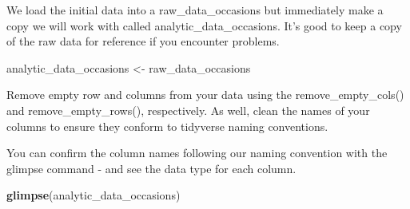 \documentclass[
]{krantz}
\makeatletter
\newenvironment{Shaded}{\begin{snugshade}}{\end{snugshade}}
\newcommand{\CommentTok}[1]{\textcolor[rgb]{0.37,0.37,0.37}{\textit{#1}}}
\newcommand{\KeywordTok}[1]{\textcolor[rgb]{0.27,0.27,0.27}{\textbf{#1}}}
\newcommand{\NormalTok}[1]{#1}
\newcommand{\OperatorTok}[1]{\textcolor[rgb]{0.43,0.43,0.43}{\textbf{#1}}}
\newcommand{\StringTok}[1]{\textcolor[rgb]{0.5,0.5,0.5}{#1}}
\newenvironment{kframe}{%
\medskip{}
\setlength{\fboxsep}{.8em}
 \def\at@end@of@kframe{}%
 \ifinner\ifhmode%
  \def\at@end@of@kframe{\end{minipage}}%
  \begin{minipage}{\columnwidth}%
 \fi\fi%
 \def\FrameCommand##1{\hskip\@totalleftmargin \hskip-\fboxsep
 \colorbox{shadecolor}{##1}\hskip-\fboxsep
     \hskip-\linewidth \hskip-\@totalleftmargin \hskip\columnwidth}%
 \MakeFramed {\advance\hsize-\width
   \@totalleftmargin\z@ \linewidth\hsize
   \@setminipage}}%
 {\par\unskip\endMakeFramed%
 \at@end@of@kframe}
\renewenvironment{Shaded}{\begin{kframe}}{\end{kframe}}
\makeatother
\begin{document}
We load the initial data into a raw\_data\_occasions but immediately make a copy we will work with called analytic\_data\_occasions. It's good to keep a copy of the raw data for reference if you encounter problems.

\begin{Shaded}
\begin{Highlighting}[]
\NormalTok{analytic_data_occasions <-}\StringTok{ }\NormalTok{raw_data_occasions}
\end{Highlighting}
\end{Shaded}

Remove empty row and columns from your data using the remove\_empty\_cols() and remove\_empty\_rows(), respectively. As well, clean the names of your columns to ensure they conform to tidyverse naming conventions.

\begin{Shaded}
\end{Shaded}

You can confirm the column names following our naming convention with the glimpse command - and see the data type for each column.

\begin{Shaded}
\begin{Highlighting}[]
\KeywordTok{glimpse}\NormalTok{(analytic_data_occasions)}
\end{Highlighting}
\end{Shaded}
\end{document}
